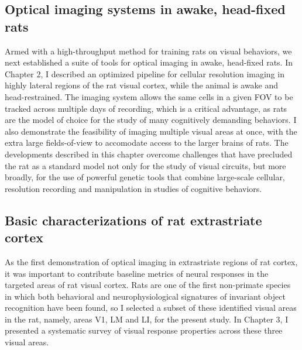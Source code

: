 \subsection{Optical imaging systems in awake, head-fixed rats}
Armed with a high-throughput method for training rats on visual behaviors, we next established a suite of tools for optical imaging in awake, head-fixed rats. In Chapter 2, I described an optimized pipeline for cellular resolution imaging in highly lateral regions of the rat visual cortex, while the animal is awake and head-restrained. The imaging system allows the same cells in a given FOV to be tracked across multiple days of recording, which is a critical advantage, as rats are the model of choice for the study of many cognitively demanding behaviors. I also demonstrate the feasibility of imaging multiple visual areas at once, with the extra large fields-of-view to accomodate access to the larger brains of rats. The developments described in this chapter overcome challenges that have precluded the rat as a standard model not only for the study of visual circuits, but more broadly, for the use of powerful genetic tools that combine large-scale cellular, resolution recording and manipulation in studies of cognitive behaviors.

\subsection{Basic characterizations of rat extrastriate cortex}
As the first demonstration of optical imaging in extrastriate regions of rat cortex, it was important to contribute baseline metrics of neural responses in the targeted areas of rat visual cortex. Rats are one of the first non-primate species in which both behavioral and neurophysiological signatures of invariant object recognition have been found, so I selected a subset of these identified visual areas in the rat, namely, areas V1, LM and LI, for the present study. In Chapter 3, I presented a systematic survey of visual response properties across these three visual areas. 

